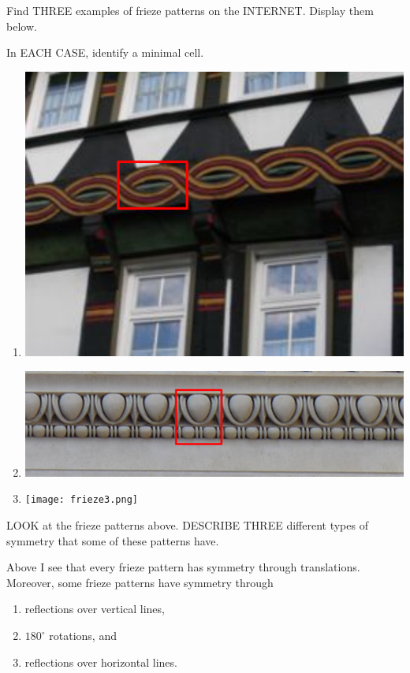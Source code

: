 \documentclass[noauthor,nooutcomes,12pt,hints,handout]{ximera}
\begin{document}
\begin{question}
  Find THREE examples of frieze patterns on the INTERNET.
  Display them below.

  In EACH CASE, identify a minimal cell.
  \begin{freeResponse}
    \begin{enumerate}
    \item \begin{center}
      \includegraphics[width=.6\textwidth]{frieze1.png}
    \end{center}
    \item
      \begin{center}
      \includegraphics[width=.6\textwidth]{frieze2.png}
      \end{center}
    \item
      \begin{center}
        \texttt{[image: frieze3.png]}
      \end{center}
    \end{enumerate}
  \end{freeResponse}
\end{question}
\mynewpage



\begin{question}
  LOOK at the frieze patterns above. DESCRIBE THREE different types of
  symmetry that some of these patterns have.
  \begin{freeResponse}
    Above I see that every frieze pattern has symmetry through
    translations.  Moreover, some frieze patterns have symmetry
    through
    \begin{enumerate}
    \item reflections over vertical lines,
    \item $180^\circ$ rotations, and
    \item reflections over horizontal
      lines.
    \end{enumerate}
  \end{freeResponse}
\end{question}
\end{document}
